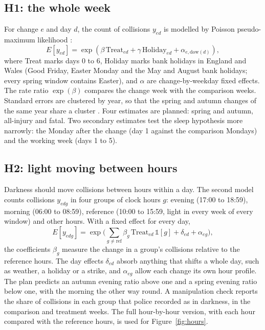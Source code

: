\documentclass[11pt,a4paper]{article}
\begin{document}
\subsection{H1: the whole week}
For change $e$ and day $d$, the count of collisions $y_{ed}$ is modelled by Poisson pseudo-maximum likelihood \citep{santos2006,correia2020}:
\begin{equation}
E[y_{ed}] = \exp(\beta\,\text{Treat}_{ed} + \gamma\,\text{Holiday}_{ed} + \alpha_{e,\text{dow}(d)}),
\end{equation}
where Treat marks days 0 to 6, Holiday marks bank holidays in England and Wales (Good Friday, Easter Monday and the May and August bank holidays; every spring window contains Easter), and $\alpha$ are change-by-weekday fixed effects. The rate ratio $\exp(\beta)$ compares the change week with the comparison weeks. Standard errors are clustered by year, so that the spring and autumn changes of the same year share a cluster \citep{cameron2015,abadie2023}. Four estimates are planned: spring and autumn, all-injury and fatal. Two secondary estimates test the sleep hypothesis more narrowly: the Monday after the change (day 1 against the comparison Mondays) and the working week (days 1 to 5).

\subsection{H2: light moving between hours}
Darkness should move collisions between hours within a day. The second model counts collisions $y_{edg}$ in four groups of clock hours $g$: evening (17:00 to 18:59), morning (06:00 to 08:59), reference (10:00 to 15:59, light in every week of every window) and other hours. With a fixed effect for every day,
\begin{equation}
E[y_{edg}] = \exp\Big(\sum_{g\neq\text{ref}} \beta_g\,\text{Treat}_{ed}\,\mathbb{1}[g] + \delta_{ed} + \alpha_{eg}\Big),
\end{equation}
the coefficients $\beta_g$ measure the change in a group's collisions relative to the reference hours. The day effects $\delta_{ed}$ absorb anything that shifts a whole day, such as weather, a holiday or a strike, and $\alpha_{eg}$ allow each change its own hour profile. The plan predicts an autumn evening ratio above one and a spring evening ratio below one, with the morning the other way round. A manipulation check reports the share of collisions in each group that police recorded as in darkness, in the comparison and treatment weeks. The full hour-by-hour version, with each hour compared with the reference hours, is used for Figure~\ref{fig:hours}.
\end{document}
